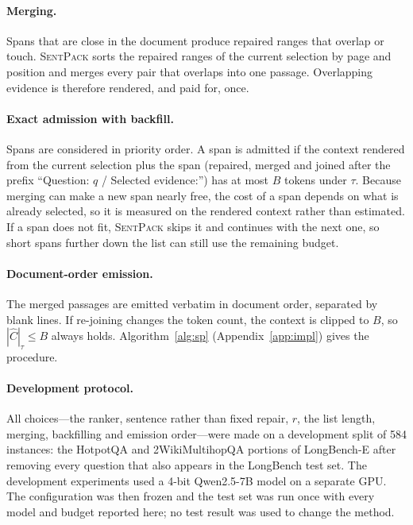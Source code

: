 \documentclass[11pt]{article}
\newcommand{\spk}{\textsc{SentPack}}
\begin{document}
\paragraph{Merging.} Spans that are close in the document produce repaired ranges that overlap or touch. \spk{} sorts the repaired ranges of the current selection by page and position and merges every pair that overlaps into one passage. Overlapping evidence is therefore rendered, and paid for, once.

\paragraph{Exact admission with backfill.} Spans are considered in priority order. A span is admitted if the context rendered from the current selection plus the span (repaired, merged and joined after the prefix ``Question: $q$ / Selected evidence:'') has at most $B$ tokens under $\tau$. Because merging can make a new span nearly free, the cost of a span depends on what is already selected, so it is measured on the rendered context rather than estimated. If a span does not fit, \spk{} skips it and continues with the next one, so short spans further down the list can still use the remaining budget.

\paragraph{Document-order emission.} The merged passages are emitted verbatim in document order, separated by blank lines. If re-joining changes the token count, the context is clipped to $B$, so $|\hat C|_\tau\le B$ always holds. Algorithm~\ref{alg:sp} (Appendix~\ref{app:impl}) gives the procedure.

\paragraph{Development protocol.}
All choices---the ranker, sentence rather than fixed repair, $r$, the list length, merging, backfilling and emission order---were made on a development split of 584 instances: the HotpotQA and 2WikiMultihopQA portions of LongBench-E \citep{bai2023longbench} after removing every question that also appears in the LongBench test set. The development experiments used a 4-bit Qwen2.5-7B model on a separate GPU. The configuration was then frozen and the test set was run once with every model and budget reported here; no test result was used to change the method.
\end{document}
